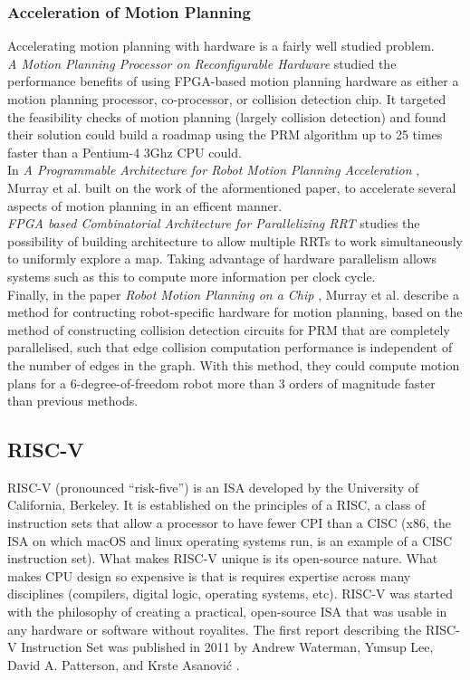     \subsubsection*{Acceleration of Motion Planning}
        Accelerating motion planning with hardware is a fairly well studied problem. \\
        \textit{A Motion Planning Processor on Reconfigurable Hardware} \cite{Atay2006} studied the performance benefits of using \gls{FPGA}-based motion planning hardware as either a motion planning processor, co-processor, or collision detection chip. It targeted the feasibility checks of motion planning (largely collision detection) and found their solution could build a roadmap using the \gls{PRM} algorithm up to 25 times faster than a Pentium-4 3Ghz CPU could. \\
        In \textit{A Programmable Architecture for Robot Motion Planning Acceleration} \cite{Murray}, Murray et al. built on the work of the aformentioned paper, to accelerate several aspects of motion planning in an efficent manner. \\
        \textit{FPGA based Combinatorial Architecture for Parallelizing RRT} \cite{Malik2015} studies the possibility of building architecture to allow multiple \gls{RRT}s to work simultaneously to uniformly explore a map. Taking advantage of hardware parallelism allows systems such as this to compute more information per clock cycle. \\
        Finally, in the paper \textit{Robot Motion Planning on a Chip} \cite{Murrayb}, Murray et al. describe a method for contructing robot-specific hardware for motion planning, based on the method of constructing collision detection circuits for \gls{PRM} that are completely parallelised, such that edge collision computation performance is independent of the number of edges in the graph. With this method, they could compute motion plans for a 6-degree-of-freedom robot more than 3 orders of magnitude faster than previous methods.

\subsection{RISC-V}
    RISC-V (pronounced ``risk-five'') is an \gls{ISA} developed by the University of California, Berkeley. It is established on the principles of a \gls{RISC}, a class of instruction sets that allow a processor to have fewer \gls{CPI} than a \gls{CISC} (x86, the \gls{ISA} on which macOS and linux operating systems run, is an example of a \gls{CISC} instruction set). What makes RISC-V unique is its open-source nature. What makes \gls{CPU} design so expensive is that is requires expertise across many disciplines (compilers, digital logic, operating systems, etc). RISC-V was started with the philosophy of creating a practical, open-source \gls{ISA} that was usable in any hardware or software without royalites. The first report describing the RISC-V Instruction Set was published in 2011 by Andrew Waterman, Yunsup Lee, David A. Patterson, and Krste Asanović \cite{Isa2012}.

